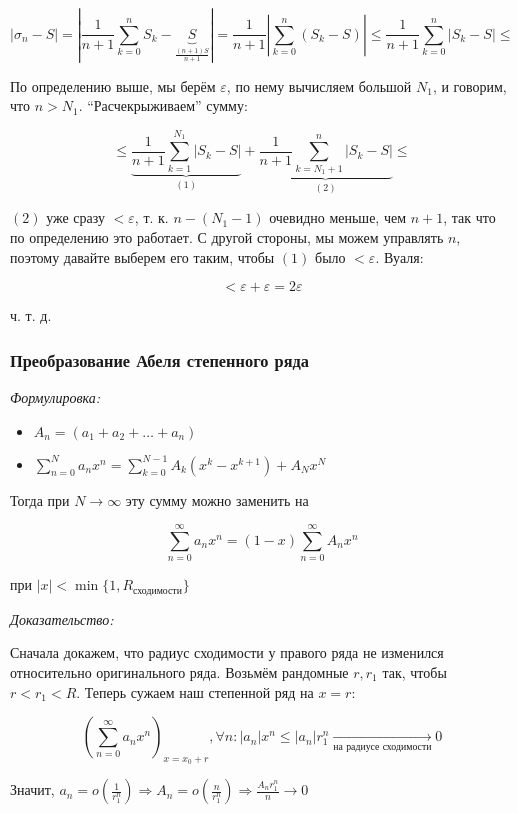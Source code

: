 \documentclass{article}
\begin{document}
\[\left|\sigma_n - S\right| = \left|\frac{1}{n + 1}\sum_{k = 0}^{n}S_k - \underbrace{S}_{\frac{(n + 1)S}{n + 1}}\right| = \frac{1}{n + 1} \left|\sum_{k = 0}^{n} \left(S_k - S\right)\right| \le \frac{1}{n + 1}\sum_{k = 0}^{n}\left|S_k - S\right| \le\]

По определению выше, мы берём $\varepsilon$, по нему вычисляем большой $N_1$, и говорим, что $n > N_{1}$. ``Расчекрыживаем'' сумму:

\[\le \underbrace{\frac{1}{n + 1}\sum_{k = 1}^{N_1} |S_k - S|}_{(1)} + \underbrace{\frac{1}{n + 1}\sum_{k = N_1 + 1}^{n} |S_k - S|}_{(2)} \le \]

$(2)$ уже сразу $< \varepsilon$, т. к. $n - (N_1 - 1)$ очевидно меньше, чем $n + 1$, так что по определению это работает. С другой стороны, мы можем управлять $n$, поэтому давайте выберем его таким, чтобы $(1)$ было $< \varepsilon$. Вуаля: 

\[< \varepsilon + \varepsilon = 2 \varepsilon\]

ч. т. д. 

\subsubsection{Преобразование Абеля степенного ряда}
\textit{Формулировка:}

\begin{itemize}
    \item $A_n = (a_1 + a_2 + \ldots + a_n)$
    \item $\sum_{n = 0}^{N} a_n x^n = \sum_{k = 0}^{N - 1} A_k(x^k - x^{k + 1}) + A_N x^N$
\end{itemize}

Тогда при $N \rightarrow \infty$ эту сумму можно заменить на

\[\sum_{n = 0}^{\infty} a_n x^n = (1 - x)\sum_{n = 0}^{\infty} A_n x^n\]

при $|x| < \min \{1, R_{\text{сходимости}}\}$

\textit{Доказательство:}

Сначала докажем, что радиус сходимости у правого ряда не изменился относительно оригинального ряда. Возьмём рандомные $r, r_1$ так, чтобы $r < r_1 < R$. Теперь сужаем наш степенной ряд на $x = r$:

\[\left(\sum_{n = 0}^{\infty} a_n x^n\right)_{x = x_0 + r}, \forall n: |a_n|x^n \le |a_n|r^n_{1} \underset{\text{на радиусе сходимости}}{\longrightarrow} 0\]

Значит, $a_n = o(\frac{1}{r^n_{1}}) \Rightarrow A_n = o(\frac{n}{r^n_1}) \Rightarrow \frac{A_nr^n_{1}}{n} \rightarrow 0$
\end{document}
